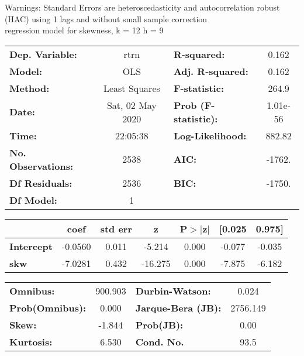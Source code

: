 Warnings: \newline
 [1] Standard Errors are heteroscedasticity and autocorrelation robust (HAC) using 1 lags and without small sample correction\\ 

regression model for skewness, k = 12 h = 9\begin{center}
\begin{tabular}{lclc}
\toprule
\textbf{Dep. Variable:}    &       rtrn       & \textbf{  R-squared:         } &     0.162   \\
\textbf{Model:}            &       OLS        & \textbf{  Adj. R-squared:    } &     0.162   \\
\textbf{Method:}           &  Least Squares   & \textbf{  F-statistic:       } &     264.9   \\
\textbf{Date:}             & Sat, 02 May 2020 & \textbf{  Prob (F-statistic):} &  1.01e-56   \\
\textbf{Time:}             &     22:05:38     & \textbf{  Log-Likelihood:    } &    882.82   \\
\textbf{No. Observations:} &        2538      & \textbf{  AIC:               } &    -1762.   \\
\textbf{Df Residuals:}     &        2536      & \textbf{  BIC:               } &    -1750.   \\
\textbf{Df Model:}         &           1      & \textbf{                     } &             \\
\bottomrule
\end{tabular}
\begin{tabular}{lcccccc}
                   & \textbf{coef} & \textbf{std err} & \textbf{z} & \textbf{P$> |$z$|$} & \textbf{[0.025} & \textbf{0.975]}  \\
\midrule
\textbf{Intercept} &      -0.0560  &        0.011     &    -5.214  &         0.000        &       -0.077    &       -0.035     \\
\textbf{skw}       &      -7.0281  &        0.432     &   -16.275  &         0.000        &       -7.875    &       -6.182     \\
\bottomrule
\end{tabular}
\begin{tabular}{lclc}
\textbf{Omnibus:}       & 900.903 & \textbf{  Durbin-Watson:     } &    0.024  \\
\textbf{Prob(Omnibus):} &   0.000 & \textbf{  Jarque-Bera (JB):  } & 2756.149  \\
\textbf{Skew:}          &  -1.844 & \textbf{  Prob(JB):          } &     0.00  \\
\textbf{Kurtosis:}      &   6.530 & \textbf{  Cond. No.          } &     93.5  \\
\bottomrule
\end{tabular}
\end{center}


